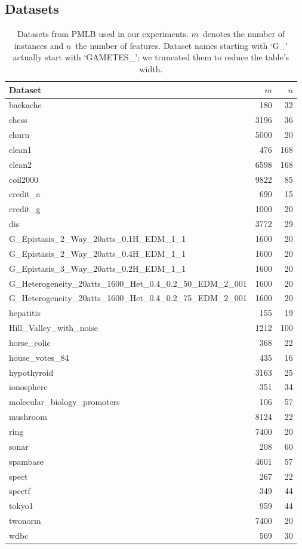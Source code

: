 \documentclass{article}
\theoremstyle{definition}
\begin{document}
\subsection{Datasets}
\label{sec:afs:experimental-design:datasets}

\begin{table}[p]
	\centering
	\begin{tabular}{lrr}
		\toprule
		Dataset & $m$ & $n$ \\
		\midrule
		backache & 180 & 32 \\
		chess & 3196 & 36 \\
		churn & 5000 & 20 \\
		clean1 & 476 & 168 \\
		clean2 & 6598 & 168 \\
		coil2000 & 9822 & 85 \\
		credit\_a & 690 & 15 \\
		credit\_g & 1000 & 20 \\
		dis & 3772 & 29 \\
		G\_Epistasis\_2\_Way\_20atts\_0.1H\_EDM\_1\_1 & 1600 & 20 \\
		G\_Epistasis\_2\_Way\_20atts\_0.4H\_EDM\_1\_1 & 1600 & 20 \\
		G\_Epistasis\_3\_Way\_20atts\_0.2H\_EDM\_1\_1 & 1600 & 20 \\
		G\_Heterogeneity\_20atts\_1600\_Het\_0.4\_0.2\_50\_EDM\_2\_001 & 1600 & 20 \\
		G\_Heterogeneity\_20atts\_1600\_Het\_0.4\_0.2\_75\_EDM\_2\_001 & 1600 & 20 \\
		hepatitis & 155 & 19 \\
		Hill\_Valley\_with\_noise & 1212 & 100 \\
		horse\_colic & 368 & 22 \\
		house\_votes\_84 & 435 & 16 \\
		hypothyroid & 3163 & 25 \\
		ionosphere & 351 & 34 \\
		molecular\_biology\_promoters & 106 & 57 \\
		mushroom & 8124 & 22 \\
		ring & 7400 & 20 \\
		sonar & 208 & 60 \\
		spambase & 4601 & 57 \\
		spect & 267 & 22 \\
		spectf & 349 & 44 \\
		tokyo1 & 959 & 44 \\
		twonorm & 7400 & 20 \\
		wdbc & 569 & 30 \\
		\bottomrule
	\end{tabular}
	\caption{
		Datasets from PMLB used in our experiments.
		$m$~denotes the number of instances and $n$~the number of features.
		Dataset names starting with `G\_' actually start with `GAMETES\_'; we truncated them to reduce the table's width.
	}
	\label{tab:afs:datasets}
\end{table}
\end{document}
